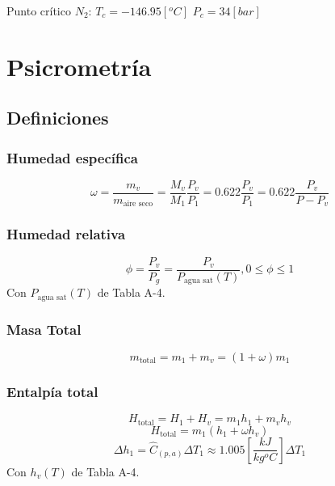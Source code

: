         Punto crítico \(N_{2}\): \(T_{c} = -146.95 [{}^{o}C]\)  \(P_{c} = 34 [bar]\)

\section{Psicrometría}

\begin{quote}
\end{quote}

    \subsection{Definiciones}
    
        \subsubsection{Humedad específica}
        \begin{equation}
        \label{humedad_especifica}
            \omega = \frac{m_{v}}{m_{\text{aire seco}}} = \frac{M_{v}}{M_{1}}\frac{P_{v}}{P_{1}}=0.622\frac{P_{v}}{P_{1}}=0.622\frac{P_{v}}{P-P_{v}}
        \end{equation}
        
        \subsubsection{Humedad relativa}
        \begin{equation}
        \label{humedad_relativa}
            \phi = \frac{P_{v}}{P_{g}} = \frac{P_{v}}{P_{\text{agua sat}}(T)}, 0 \leq \phi \leq 1
        \end{equation}
        Con \(P_{\text{agua sat}}(T)\) de Tabla A-4.
        
        \subsubsection{Masa Total}
        \begin{equation}
        \label{masa_total}
            m_{\text{total}} = m_{1} + m_{v} = (1 + \omega)m_{1}
        \end{equation}
        
        \subsubsection{Entalpía total}
        \[H_{\text{total}} = H_{1} + H_{v} = m_{1}h_{1} + m_{v}h_{v}\]
        \begin{equation}
        \label{entalpia_total}
            H_{\text{total}} = m_{1}(h_{1} + \omega h_{v})
        \end{equation}
        \[\Delta h_{1} = \hat{C}_{(p,a)}\Delta T_{1} \approx 1.005\left [ \frac{kJ}{kg{}^{o}C} \right ] \Delta T_{1}\]
        Con \(h_{v}(T)\) de Tabla A-4.

